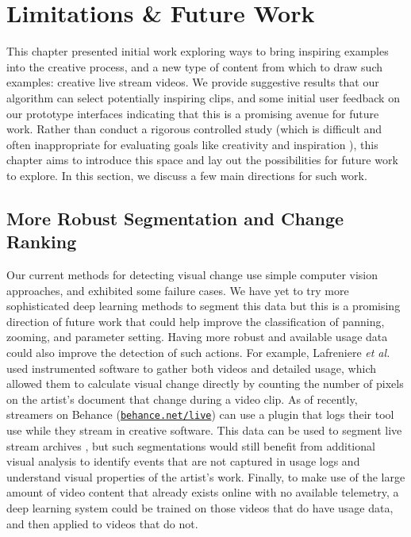 \section{Limitations \& Future Work}
This chapter presented initial work exploring ways to bring inspiring examples into the creative process, and a new type of content from which to draw such examples: creative live stream videos. We provide suggestive results that our algorithm can select potentially inspiring clips, and some initial user feedback on our prototype interfaces indicating that this is a promising avenue for future work. Rather than conduct a rigorous controlled study (which is difficult and often inappropriate for evaluating goals like creativity and inspiration \cite{Shneiderman2007}), this chapter aims to introduce this space and lay out the possibilities for future work to explore. In this section, we discuss a few main directions for such work.

\subsection{More Robust Segmentation and Change Ranking}
Our current methods for detecting visual change use simple computer vision approaches, and exhibited some failure cases. We have yet to try more sophisticated deep learning methods to segment this data but this is a promising direction of future work that could help improve the classification of panning, zooming, and parameter setting. Having more robust and available usage data could also improve the detection of such actions. For example, Lafreniere \textit{et al.} \cite{Lafreniere2014} used instrumented software to gather both videos and detailed usage, which allowed them to calculate visual change directly by counting the number of pixels on the artist's document that change during a video clip. As of recently, streamers on Behance (\href{https://behance.net/live}{\nolinkurl{behance.net/live}}) can use a plugin that logs their tool use while they stream in creative software. This data can be used to segment live stream archives \cite{Fraser2020}, but such segmentations would still benefit from additional visual analysis to identify events that are not captured in usage logs and understand visual properties of the artist's work. Finally, to make use of the large amount of video content that already exists online with no available telemetry, a deep learning system could be trained on those videos that do have usage data, and then applied to videos that do not.

